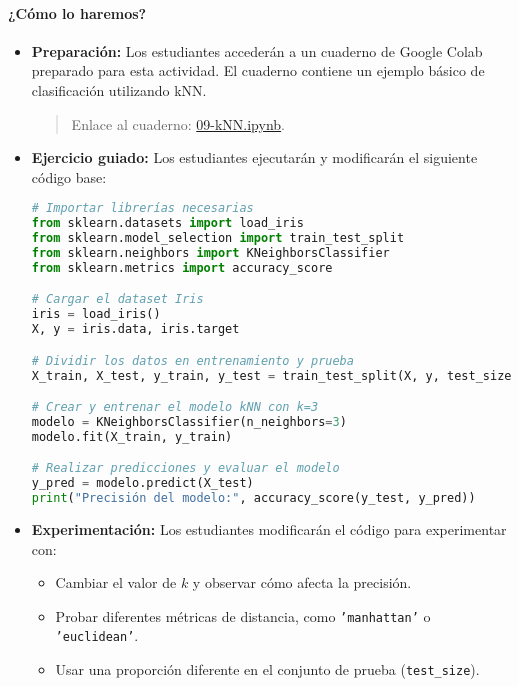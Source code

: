 \documentclass[a4,11pt]{aleph-notas}
\begin{document}
\paragraph{¿Cómo lo haremos?}  
\begin{itemize}[leftmargin=*]
    \item \textbf{Preparación:}  
    Los estudiantes accederán a un cuaderno de Google Colab preparado para esta actividad. El cuaderno contiene un ejemplo básico de clasificación utilizando kNN.
    \begin{quote}
        Enlace al cuaderno: \href{https://colab.research.google.com/github/andres-merino/AprendizajeAutomaticoInicial-05-N0105/blob/main/2-Notebooks/09-kNN.ipynb}{09-kNN.ipynb}.
    \end{quote}

    \item \textbf{Ejercicio guiado:}  
    Los estudiantes ejecutarán y modificarán el siguiente código base:
\begin{pycodigo}
\begin{lstlisting}[language=Python]
# Importar librerías necesarias
from sklearn.datasets import load_iris
from sklearn.model_selection import train_test_split
from sklearn.neighbors import KNeighborsClassifier
from sklearn.metrics import accuracy_score

# Cargar el dataset Iris
iris = load_iris()
X, y = iris.data, iris.target

# Dividir los datos en entrenamiento y prueba
X_train, X_test, y_train, y_test = train_test_split(X, y, test_size=0.3, random_state=42)

# Crear y entrenar el modelo kNN con k=3
modelo = KNeighborsClassifier(n_neighbors=3)
modelo.fit(X_train, y_train)

# Realizar predicciones y evaluar el modelo
y_pred = modelo.predict(X_test)
print("Precisión del modelo:", accuracy_score(y_test, y_pred))
\end{lstlisting}
\end{pycodigo}

    \item \textbf{Experimentación:}  
    Los estudiantes modificarán el código para experimentar con:
    \begin{itemize}[leftmargin=*]
        \item Cambiar el valor de \(k\) y observar cómo afecta la precisión.
        \item Probar diferentes métricas de distancia, como \texttt{'manhattan'} o \texttt{'euclidean'}.
        \item Usar una proporción diferente en el conjunto de prueba (\texttt{test\_size}).
    \end{itemize}
\end{itemize}
\end{document}
